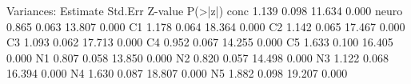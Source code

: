 \begin{Schunk}
\begin{Soutput}
Variances:
                   Estimate  Std.Err  Z-value  P(>|z|)
    conc              1.139    0.098   11.634    0.000
    neuro             0.865    0.063   13.807    0.000
    C1                1.178    0.064   18.364    0.000
    C2                1.142    0.065   17.467    0.000
    C3                1.093    0.062   17.713    0.000
    C4                0.952    0.067   14.255    0.000
    C5                1.633    0.100   16.405    0.000
    N1                0.807    0.058   13.850    0.000
    N2                0.820    0.057   14.498    0.000
    N3                1.122    0.068   16.394    0.000
    N4                1.630    0.087   18.807    0.000
    N5                1.882    0.098   19.207    0.000
\end{Soutput}
\end{Schunk}
